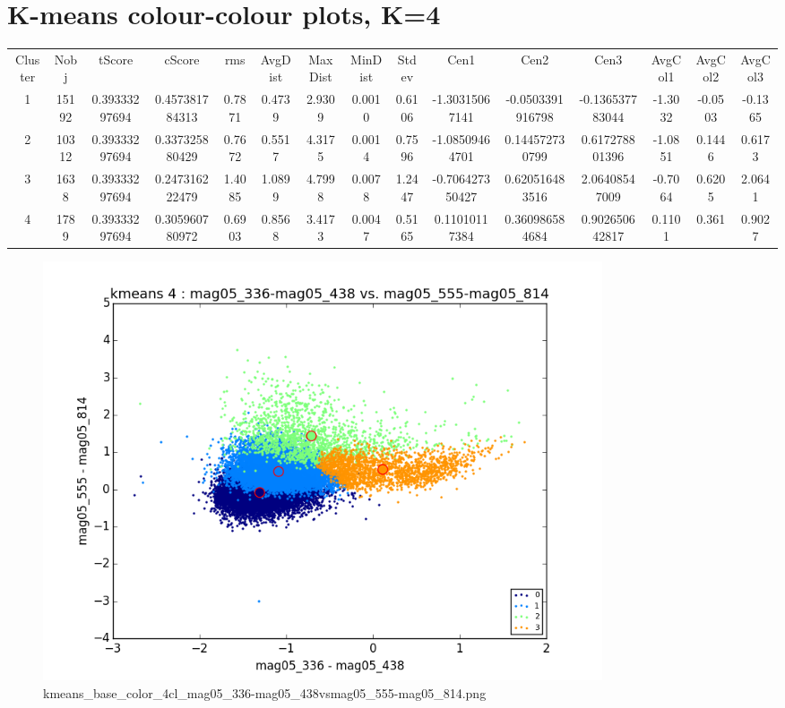 \documentclass{article}%
\begin{document}
\section*{K{-}means colour{-}colour plots, K=4}%
\begin{table}
\begin{tabular}{ccccccccccccccc}
Cluster & Nobj & tScore & cScore & rms & AvgDist & MaxDist & MinDist & Stdev & Cen1 & Cen2 & Cen3 & AvgCol1 & AvgCol2 & AvgCol3 \\
1 & 15192 & 0.39333297694 & 0.457381784313 & 0.7871 & 0.4739 & 2.9309 & 0.0010 & 0.6106 & -1.30315067141 & -0.0503391916798 & -0.136537783044 & -1.3032 & -0.0503 & -0.1365 \\
2 & 10312 & 0.39333297694 & 0.337325880429 & 0.7672 & 0.5517 & 4.3175 & 0.0014 & 0.7596 & -1.08509464701 & 0.144572730799 & 0.617278801396 & -1.0851 & 0.1446 & 0.6173 \\
3 & 1638 & 0.39333297694 & 0.247316222479 & 1.4085 & 1.0899 & 4.7998 & 0.0078 & 1.2447 & -0.706427350427 & 0.620516483516 & 2.06408547009 & -0.7064 & 0.6205 & 2.0641 \\
4 & 1789 & 0.39333297694 & 0.305960780972 & 0.6903 & 0.8568 & 3.4173 & 0.0047 & 0.5165 & 0.11010117384 & 0.360986584684 & 0.902650642817 & 0.1101 & 0.361 & 0.9027 \\
\end{tabular}
\end{table}
%


\begin{figure}%
\centering%
\includegraphics[width=0.8\textwidth]{kmeans_base_color_4cl_mag05_336-mag05_438vsmag05_555-mag05_814.png}%
\caption{kmeans\_base\_color\_4cl\_mag05\_336{-}mag05\_438vsmag05\_555{-}mag05\_814.png}%
\end{figure}
\end{document}
